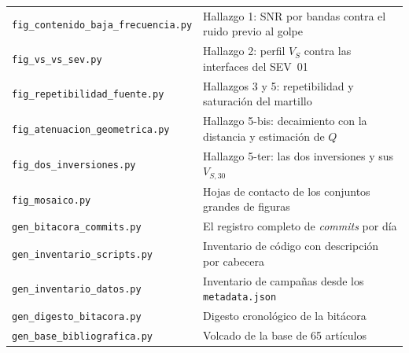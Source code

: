 \begin{center}\footnotesize
\begin{tabularx}{\textwidth}{@{}l X@{}}
\toprule
\texttt{fig\_contenido\_baja\_frecuencia.py} & Hallazgo 1: SNR por bandas contra el ruido previo al golpe \\
\texttt{fig\_vs\_vs\_sev.py} & Hallazgo 2: perfil $V_S$ contra las interfaces del SEV~01 \\
\texttt{fig\_repetibilidad\_fuente.py} & Hallazgos 3 y 5: repetibilidad y saturaci\'on del martillo \\
\texttt{fig\_atenuacion\_geometrica.py} & Hallazgo 5-bis: decaimiento con la distancia y estimaci\'on de $Q$ \\
\texttt{fig\_dos\_inversiones.py} & Hallazgo 5-ter: las dos inversiones y sus $V_{S,30}$ \\
\texttt{fig\_mosaico.py} & Hojas de contacto de los conjuntos grandes de figuras \\
\texttt{gen\_bitacora\_commits.py} & El registro completo de \emph{commits} por d\'ia \\
\texttt{gen\_inventario\_scripts.py} & Inventario de c\'odigo con descripci\'on por cabecera \\
\texttt{gen\_inventario\_datos.py} & Inventario de campa\~nas desde los \texttt{metadata.json} \\
\texttt{gen\_digesto\_bitacora.py} & Digesto cronol\'ogico de la bit\'acora \\
\texttt{gen\_base\_bibliografica.py} & Volcado de la base de 65 art\'iculos \\
\bottomrule
\end{tabularx}
\end{center}